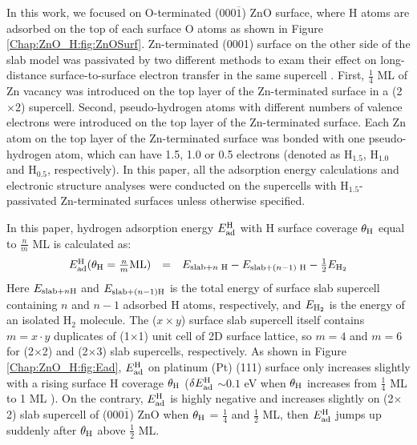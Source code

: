 In this work, we focused on O-terminated (000$\overline{1}$) ZnO surface, where H atoms are adsorbed on the top of each surface O atoms as shown in Figure \ref{Chap:ZnO_H:fig:ZnOSurf}. Zn-terminated (0001) surface on the other side of the slab model was passivated by two different methods to exam their effect on long-distance surface-to-surface electron transfer in the same supercell \cite{zhang2018tuning}. First, $\frac{1}{4}$ ML of Zn vacancy was introduced on the top layer of the Zn-terminated surface in a (2$\times$2) supercell. Second, pseudo-hydrogen atoms with different numbers of valence electrons were introduced on the top layer of the Zn-terminated surface. Each Zn atom on the top layer of the Zn-terminated surface was bonded with one pseudo-hydrogen atom, which can have 1.5, 1.0 or 0.5 electrons (denoted as H$_{1.5}$, H$_{1.0}$ and H$_{0.5}$, respectively). In this paper, all the adsorption energy calculations and electronic structure analyses were conducted on the supercells with H$_{1.5}$-passivated Zn-terminated surfaces unless otherwise specified.



In this paper, hydrogen adsorption energy $E_{\textup{ad}}^{\textup{H}}$ with H surface coverage $\theta_{\textup{H}}$ equal to $\frac{n}{m}$ ML is calculated as:
\begin{equation}
  \begin{array}{rcl}
       E_{\textup{ad}}^{\textup{H}}(\theta_{\textup{H}}=\frac{n}{m} \textup{ML})&=&E_{\textup{slab+}n\textup{ H}}-E_{\textup{slab+}(n-1) \textup{ H}}-\frac{1}{2}E_{\textup{H}_{2}}
  \end{array}
  \label{eq1}
\end{equation}
Here $E_{\textup{slab+}n \textup{H}}$ and $E_{\textup{slab+}(n-1) \textup{H}}$ is the total energy of surface slab supercell containing $n$ and $n-1$ adsorbed H atoms, respectively, and $E_{\textup{H}_{2}}$ is the energy of an isolated H$_2$ molecule. The ($x\times y$) surface slab supercell itself contains $m=x\cdot y$ duplicates of (1$\times$1) unit cell of 2D surface lattice, so $m=4$ and $m=6$ for (2$\times$2) and (2$\times$3) slab supercells, respectively. As shown in Figure \ref{Chap:ZnO_H:fig:Ead}, $E_{\textup{ad}}^{\textup{H}}$ on platinum (Pt) (111) surface only increases slightly with a rising surface H coverage $\theta_{\textup{H}}$ ($\delta E_{\textup{ad}}^{\textup{H}}$ $\sim0.1$ eV when  $\theta_{\textup{H}}$ increases from $\frac{1}{4}$ ML to 1 ML ). On the contrary, $E_{\textup{ad}}^{\textup{H}}$ is highly negative and increases slightly on (2$\times$2) slab supercell of (000$\overline{1}$) ZnO when  $\theta_{\textup{H}}$ = $\frac{1}{4}$ and $\frac{1}{2}$ ML, then $E_{\textup{ad}}^{\textup{H}}$ jumps up suddenly after $\theta_{\textup{H}}$ above $\frac{1}{2}$ ML. 

